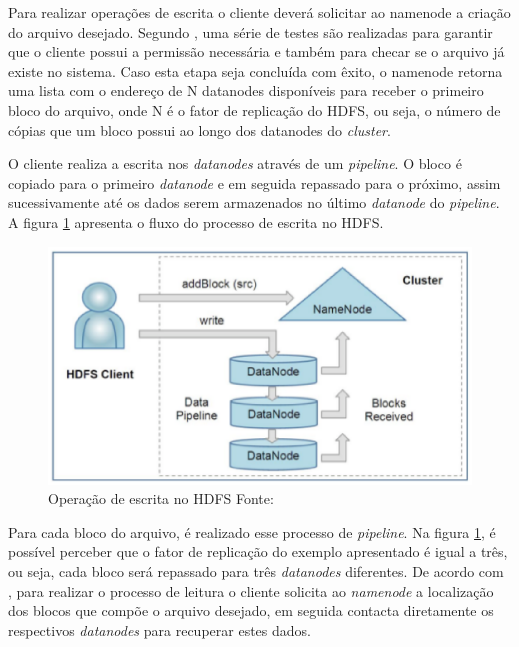 Para realizar operações de escrita o cliente deverá solicitar ao namenode a criação do arquivo desejado. Segundo , uma série de testes são realizadas para garantir que o cliente possui a permissão necessária e também para checar se o arquivo já existe no sistema. Caso esta etapa seja concluída com êxito, o namenode retorna uma lista com o endereço de N datanodes disponíveis para receber o primeiro bloco do arquivo, onde N é o fator de replicação do HDFS, ou seja, o número de cópias que um bloco possui ao longo dos datanodes do \textit{cluster}.

O cliente realiza a escrita nos \textit{datanodes} através de um \textit{pipeline}. O bloco é copiado para o primeiro \textit{datanode} e em seguida repassado para o próximo, assim sucessivamente até os dados serem armazenados no último \textit{datanode} do \textit{pipeline}. A figura \ref{fig-hdfs-escrita} apresenta o fluxo do processo de escrita no HDFS.

\begin{figure}[ht!]
	\centering
	\includegraphics[keepaspectratio=true,scale=0.5]
	  {figuras/hdfs-escrita.eps}
	\caption[Operação de escrita no HDFS]{Operação de escrita no HDFS
	\protect\linebreak Fonte: \cite{shvachko2010}}
	\label{fig-hdfs-escrita}
\end{figure}
\FloatBarrier

Para cada bloco do arquivo, é realizado esse processo de \textit{pipeline}. Na figura \ref{fig-hdfs-escrita}, é possível perceber que o fator de replicação do exemplo apresentado é igual a três, ou seja, cada bloco será repassado para três \textit{datanodes} diferentes. De acordo com , para realizar o processo de leitura o cliente solicita ao \textit{namenode} a localização dos blocos que compõe o arquivo desejado, em seguida contacta diretamente os respectivos \textit{datanodes} para recuperar estes dados.


